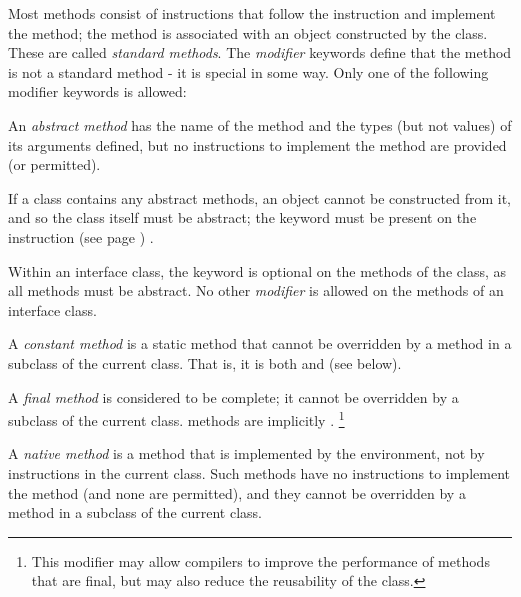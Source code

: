 Most methods consist of instructions that follow the 
instruction and implement the method; the method is associated with an
object constructed by the class.
These are called \emph{standard methods}.
The \emph{modifier} keywords define that the method is not a
standard method - it is special in some way.
Only one of the following modifier keywords is allowed:
\begin{description}
\item[abstract]

An \emph{abstract method} has the name of the method and the types
(but not values) of its arguments defined, but no instructions to
implement the method are provided (or permitted).
 
If a class contains any abstract methods, an object cannot be
constructed from it, and so the class itself must be abstract; the
 keyword must be present on the
  instruction (see page \pageref{refclass}) .
 
Within an interface class, the  keyword is optional on
the methods of the class, as all methods must be abstract.  No other
\emph{modifier} is allowed on the methods of an interface class.
\item[constant]

A \emph{constant method} is a static method that cannot be
overridden by a method in a subclass of the current class.
That is, it is both  and  (see below).
\item[final]

A \emph{final method} is considered to be complete; it cannot be
overridden by a subclass of the current class.   methods
are implicitly .
\footnote{
This modifier may allow compilers to improve the performance of methods
that are final, but may also reduce the reusability of the class.
}
\item[native]

A \emph{native method} is a method that is implemented by the
environment, not by instructions in the current class.
Such methods have no \nr{} instructions to implement the method (and
none are permitted), and they cannot be overridden by a method in a
subclass of the current class.
 

\end{description}
